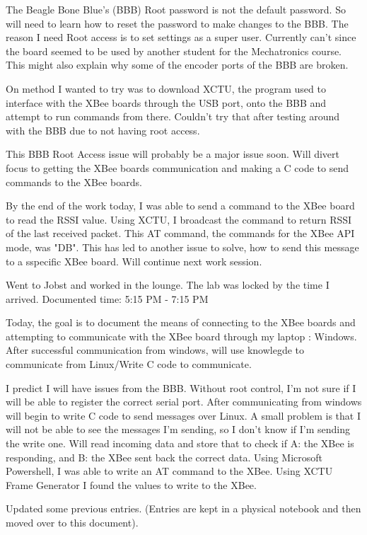 \documentclass[fontsize=11pt, %
                             paper=letter, %
                             twoside, %
                             captions=tableheading,
                             index=totoc,
                             hyperref]{labbook}
\begin{document}
\begin{addmargin}[0cm]{0cm}
The Beagle Bone Blue's (BBB) Root password is not the default password. So will need to learn how to reset the password to make changes to the BBB. The reason I need Root access is to set settings as a super user. Currently can't since the board seemed to be used by another student for the Mechatronics course. This might also explain why some of the encoder ports of the BBB are broken. 

On method I wanted to try was to download XCTU, the program used to interface with the XBee boards through the USB port, onto the BBB and attempt to run commands from there. Couldn't try that after testing around with the BBB due to not having root access. 

This BBB Root Access issue will probably be a major issue soon. Will divert focus to getting the XBee boards communication and making a C code to send commands to the XBee boards. 

By the end of the work today, I was able to send a command to the XBee board to read the RSSI value. Using XCTU, I broadcast the command to return RSSI of the last received packet. This AT command, the commands for the XBee API mode, was "DB". This has led to another issue to solve, how to send this message to a sspecific XBee board. Will continue next work session.


Went to Jobst and worked in the lounge. The lab was locked by the time I arrived. 
Documented time: 5:15 PM - 7:15 PM

Today, the goal is to document the means of connecting to the XBee boards and attempting to communicate with the XBee board through my laptop : Windows. After successful communication from windows, will use knowlegde to communicate from Linux/Write C code to communicate. 

I predict I will have issues from the BBB. Without root control, I'm not sure if I will be able to register the correct serial port. After communicating from windows will begin to write C code to send messages over Linux. A small problem is that I will not be able to see the messages I'm sending, so I don't know if I'm sending the write one. Will read incoming data and store that to check if A: the XBee is responding, and B: the XBee sent back the correct data. Using Microsoft Powershell, I was able to write an AT command to the XBee. Using XCTU Frame Generator I found the values to write to the XBee.  


Updated some previous entries. (Entries are kept in a physical notebook and then moved over to this document). 


\end{addmargin}
\end{document}
